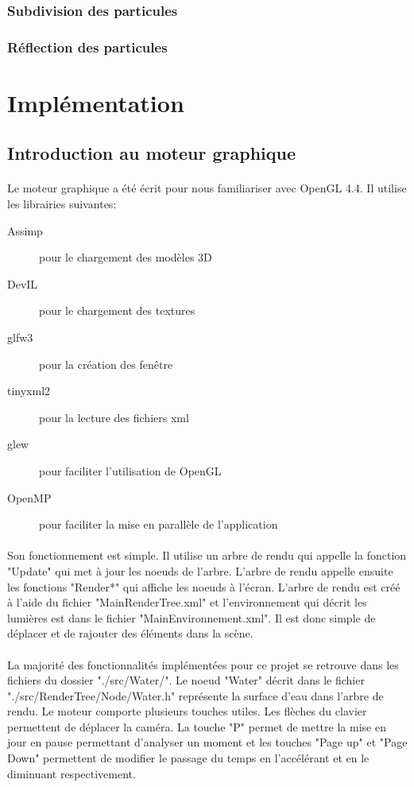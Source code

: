 \documentclass[a4paper, 12pt]{article} %
\begin{document}
	\subsubsection{Subdivision des particules}
	\subsubsection{Réflection des particules}


\section{Implémentation}
\subsection{Introduction au moteur graphique}
	\paragraph{}
	Le moteur graphique a été écrit pour nous familiariser avec OpenGL 4.4. Il utilise les librairies suivantes:
	\begin{description}
		\item[Assimp] pour le chargement des modèles 3D
		\item[DevIL] pour le chargement des textures
		\item[glfw3] pour la création des fenêtre
		\item[tinyxml2] pour la lecture des fichiers xml
		\item[glew] pour faciliter l'utilisation de OpenGL
		\item[OpenMP] pour faciliter la mise en parallèle de l'application
	\end{description}
	
	\paragraph{}
	Son fonctionnement est simple. Il utilise un arbre de rendu qui appelle la fonction "Update" qui met à jour les noeuds de l'arbre.
	L'arbre de rendu appelle ensuite les fonctions "Render*" qui affiche les noeuds à l'écran. L'arbre de rendu est créé à l'aide du
	fichier "MainRenderTree.xml" et l'environnement qui décrit les lumières est dans le fichier "MainEnvironnement.xml". Il est donc
	simple de déplacer et de rajouter des éléments dans la scène.

	\paragraph{}
	La majorité des fonctionnalités implémentées pour ce projet se retrouve dans les fichiers du dossier "./src/Water/". Le noeud 
	"Water" décrit dans le fichier "./src/RenderTree/Node/Water.h" représente la surface d'eau dans l'arbre de rendu.
	Le moteur comporte plusieurs touches utiles. Les flèches du clavier permettent de déplacer la caméra. La touche "P" permet de mettre la mise en jour
	en pause permettant d'analyser un moment et les touches "Page up" et "Page Down" permettent de modifier le passage du temps en l'accélérant et en 
	le diminuant respectivement.
\end{document}
